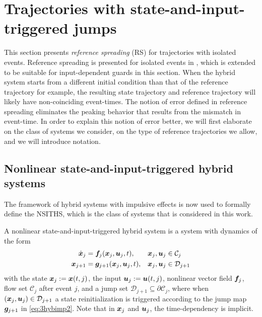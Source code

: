 \documentclass[../DC2017114Bouma.tex]{subfiles}
\begin{document}
\section{Trajectories with state-and-input-triggered jumps}
This section presents \textit{reference spreading} (RS) for trajectories with isolated events. Reference spreading is presented for isolated events in \cite{Saccon2014}, which is extended to be suitable for input-dependent guards in this section. When the hybrid system starts from a different initial condition than that of the reference trajectory for example, the resulting state trajectory and reference trajectory will likely have non-coinciding event-times. The notion of error defined in reference spreading eliminates the peaking behavior that results from the mismatch in event-time. In order to explain this notion of error better, we will first elaborate on the class of systems we consider, on the type of reference trajectories we allow, and we will introduce notation.
%

\subsection{Nonlinear state-and-input-triggered hybrid systems}
The framework of hybrid systems with impulsive effects is now used to formally define the NSITHS, which is the class of systems that is considered in this work.

\begin{sloppypar}
\begin{mydef}[NSITHS]\label{def:3nsiths}
A nonlinear state-and-input-triggered hybrid system is a system with dynamics of the form
\begin{align}
\dot{{\boldsymbol{x}}}_j &={\boldsymbol{f}}_j({\boldsymbol{x}}_j,{\boldsymbol{u}}_j,t), &{\boldsymbol{x}}_j,{\boldsymbol{u}}_j&\in \mathcal{C}_j\label{eq:3hybimp1}\\
{\boldsymbol{x}}_{j+1} &= {\boldsymbol{g}}_{j+1}({\boldsymbol{x}}_j,{\boldsymbol{u}}_j,t), &{\boldsymbol{x}}_j,{\boldsymbol{u}}_j&\in \mathcal{D}_{j+1} \label{eq:3hybimp2}
\end{align}
with the state ${\boldsymbol{x}}_j := {\boldsymbol{x}}(t,j)$, the input ${\boldsymbol{u}}_j := {\boldsymbol{u}}(t,j)$, nonlinear vector field ${\boldsymbol{f}}_j$, flow set $\mathcal{C}_j$ after event $j$, and a jump set $\mathcal{D}_{j+1}\subseteq\partial \mathcal{C}_j$, where when $({\boldsymbol{x}}_j,{\boldsymbol{u}}_j)\in \mathcal{D}_{j+1}$ a state reinitialization is triggered according to the jump map $ {\boldsymbol{g}}_{j+1}$ in \eqref{eq:3hybimp2}. Note that in ${\boldsymbol{x}}_j$ and ${\boldsymbol{u}}_j$, the time-dependency is implicit.
\end{mydef} 
\end{sloppypar}
\end{document}
